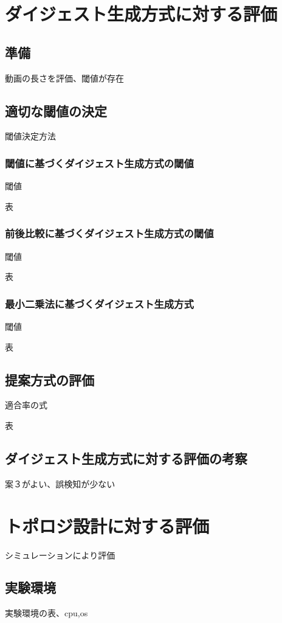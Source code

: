 \section{ダイジェスト生成方式に対する評価}
\subsection{準備}
動画の長さを評価、閾値が存在

\subsection{適切な閾値の決定}
閾値決定方法

\subsubsection{閾値に基づくダイジェスト生成方式の閾値}
閾値

表

\subsubsection{前後比較に基づくダイジェスト生成方式の閾値}
閾値

表

\subsubsection{最小二乗法に基づくダイジェスト生成方式}
閾値

表

\subsection{提案方式の評価}
適合率の式

表

\subsection{ダイジェスト生成方式に対する評価の考察}
案３がよい、誤検知が少ない


\section{トポロジ設計に対する評価}
シミュレーションにより評価

\subsection{実験環境}
実験環境の表、cpu,os

